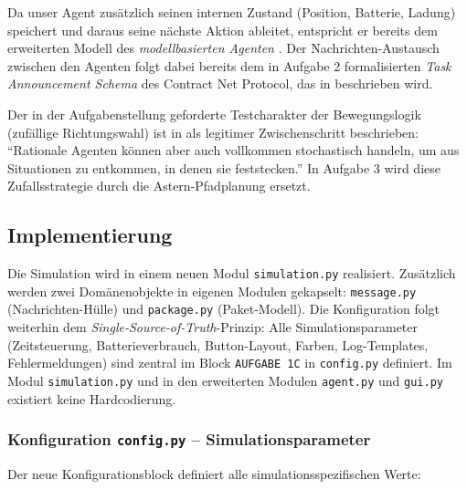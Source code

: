 Da unser Agent zusätzlich seinen internen Zustand (Position, Batterie, Ladung) speichert und daraus seine nächste Aktion ableitet, entspricht er bereits dem erweiterten Modell des \textit{modellbasierten Agenten} \cite[S. 19\,f.]{5}. Der Nachrichten-Austausch zwischen den Agenten folgt dabei bereits dem in Aufgabe 2 formalisierten \textit{Task Announcement Schema} des Contract Net Protocol, das in \textcite[S. 30]{5} beschrieben wird.

Der in der Aufgabenstellung geforderte Testcharakter der Bewegungslogik (zufällige Richtungswahl) ist in \textcite[S. 11]{5} als legitimer Zwischenschritt beschrieben: \enquote{Rationale Agenten können aber auch vollkommen stochastisch handeln, um aus Situationen zu entkommen, in denen sie feststecken.} In Aufgabe 3 wird diese Zufallsstrategie durch die \acs{Astern}-Pfadplanung ersetzt.

\subsection{Implementierung}

Die Simulation wird in einem neuen Modul \texttt{simulation.py} realisiert. Zusätzlich werden zwei Domänenobjekte in eigenen Modulen gekapselt: \texttt{message.py} (Nachrichten-Hülle) und \texttt{package.py} (Paket-Modell). Die Konfiguration folgt weiterhin dem \textit{Single-Source-of-Truth}-Prinzip: Alle Simulationsparameter (Zeitsteuerung, Batterieverbrauch, Button-Layout, Farben, Log-Templates, Fehlermeldungen) sind zentral im Block \texttt{AUFGABE 1C} in \texttt{config.py} definiert. Im Modul \texttt{simulation.py} und in den erweiterten Modulen \texttt{agent.py} und \texttt{gui.py} existiert keine Hardcodierung.


\subsubsection{Konfiguration \texttt{config.py} – Simulationsparameter}

Der neue Konfigurationsblock definiert alle simulationsspezifischen Werte:



